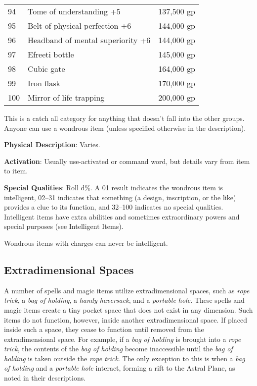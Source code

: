 \begin{table}[]
\begin{tabularx}{\linewidth}{lXl}
94  & Tome of understanding +5                       & 137,500 gp   \\
95  & Belt of physical perfection +6                 & 144,000 gp   \\
96  & Headband of mental superiority +6              & 144,000 gp   \\
97  & Efreeti bottle                                 & 145,000 gp   \\
98  & Cubic gate                                     & 164,000 gp   \\
99  & Iron flask                                     & 170,000 gp   \\
100 & Mirror of life trapping                        & 200,000 gp  
\end{tabularx}
\end{table}

\label{f0}				
This is a catch all category for anything that doesn't fall into the other groups. Anyone can use a wondrous item (unless specified otherwise in the description).
				
\textbf{Physical Description}: Varies.
				
\textbf{Activation}: Usually use-activated or command word, but details vary from item to item.
				
\textbf{Special Qualities}: Roll d\%. A 01 result indicates the wondrous item is intelligent, 02--31 indicates that something (a design, inscription, or the like) provides a clue to its function, and 32--100 indicates no special qualities. Intelligent items have extra abilities and sometimes extraordinary powers and special purposes (see Intelligent Items).
				
Wondrous items with charges can never be intelligent.
				
\subsection{Extradimensional Spaces}

			
A number of spells and magic items utilize extradimensional spaces, such as \textit{rope trick}, a \textit{bag of holding}, a \textit{handy haversack}, and a \textit{portable hole}. These spells and magic items create a tiny pocket space that does not exist in any dimension. Such items do not function, however, inside another extradimensional space. If placed inside such a space, they cease to function until removed from the extradimensional space. For example, if a \textit{bag of holding} is brought into a\textit{ rope trick}, the contents of the \textit{bag of holding} become inaccessible until the \textit{bag of holding} is taken outside the \textit{rope trick}. The only exception to this is when a\textit{ bag of holding} and a \textit{portable hole} interact, forming a rift to the Astral Plane, as noted in their descriptions.
				
